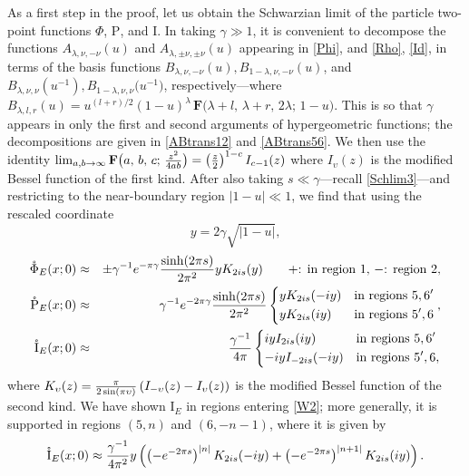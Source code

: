 \documentclass[12pt]{article}
\newcommand{\be}{\begin{equation}}
\newcommand{\ee}{\end{equation}}
\newcommand{\bea}{\begin{eqnarray}}
\newcommand{\eea}{\end{eqnarray}}
\newcommand{\hgfs}{\mathbf{F}}
\newcommand{\lt}{\left}
\newcommand{\rt}{\right}
\newcommand{\Rho}{\mathrm{P}}
\newcommand{\Iota}{\mathrm{I}}
\newcommand{\lam}{\lambda}
\newcommand{\ga}{\gamma}
\newcommand{\ov}{\over}
\begin{document}
As a first step in the proof, let us obtain the Schwarzian limit of the particle two-point functions $\Phi$, $\Rho$, and $\Iota$. In taking $\ga \gg 1$, it is convenient to decompose the functions $A_{\lam, \nu, -\nu}(u)$ and $A_{\lam, \pm \nu, \pm \nu}(u)$ appearing in \eqref{Phi}, and \eqref{Rho}, \eqref{Id}, in terms of the basis functions $B_{\lam, \nu, -\nu}(u), B_{1-\lam, \nu, -\nu}(u)$, and $B_{\lam, \nu, \nu}(u^{-1}), B_{1-\lam, \nu, \nu}\bigl(u^{-1}\bigr)$, respectively---where $B_{\lambda,l,r}(u)=u^{(l+r)/2}(1-u)^{\lambda}\,\hgfs\bigl(\lambda+l,\,\lambda+r,\,2\lambda;\,1-u\bigr)$.
This is so that $\ga$ appears in only the first and second arguments of hypergeometric functions; the decompositions are given in \eqref{ABtrans12} and \eqref{ABtrans56}. We then use the identity $\lim_{a, b\to \infty}\hgfs\bigl(a, \, b, \, c; \, {z^2 \ov 4 a b} \bigr)=\lt({z \ov 2}\rt)^{1-c}I_{c-1}(z)$ where $I_{\upsilon}(z)$ is the modified Bessel function of the first kind. After also taking $s \ll \ga$---recall \eqref{Schlim3}---and restricting to the near-boundary region $|1-u| \ll 1$, we find that using the rescaled coordinate
\be \label{ydef}
y=2\ga \sqrt{|1-u|},
\ee
\bea \label{SchPhi}
\mathring{\Phi}_{E}(x; 0)&\approx& \pm \ga^{-1}e^{-\pi \ga}{\sinh(2\pi s) \ov 2 \pi^2}y K_{2 is }(y) \qquad \text{$+$: in region $1$, $-$: region $2$},\\ \label{SchRho}
\mathring{\Rho}_{E}(x; 0)&\approx&   \ga^{-1}e^{-2\pi \ga}{\sinh(2\pi s) \ov 2 \pi^2} \begin{dcases}
y K_{2 is }(-iy) & \text{in regions $5,6'$}\\
y K_{2 is }(iy) & \text{in regions $5',6$}
\end{dcases},\\ \label{SchG}
\mathring{\Iota}_{E}(x; 0)&\approx&   {\ga^{-1} \ov 4 \pi} \begin{dcases}
i y I_{2 is }(iy) & \text{in regions $5,6'$}\\
-i y I_{-2 is }(-iy) & \text{in regions $5',6$},
\end{dcases}
\eea
where $K_{\upsilon}(z)={\pi \ov 2 \sin(\pi \upsilon)}\lt(I_{-\upsilon}(z)-I_{\upsilon}(z) \rt)$ is the modified Bessel function of the second kind. We have shown $\Iota_E$ in regions entering \eqref{W2}; more generally, it is supported in regions $(5,n)$ and $(6, -n-1)$, where it is given by
\be \label{genSchG}
\mathring{\Iota}_E(x;0)\approx {\ga^{-1} \ov 4 \pi^2} y\lt(\lt( -e^{-2\pi s}\rt)^{|n|}K_{2is}(-i y)+\lt(-e^{-2\pi s}\rt)^{|n+1|}K_{2i s}(i y)\rt).
\ee
\end{document}
